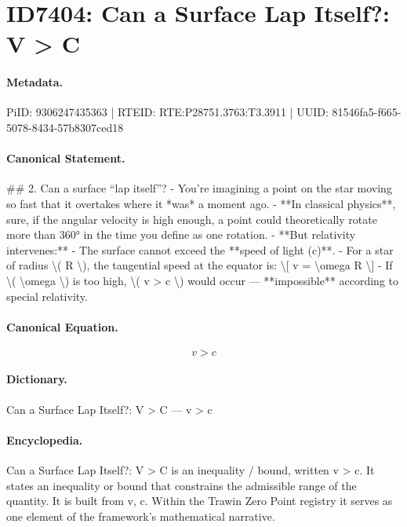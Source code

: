 \section*{ID7404: Can a Surface Lap Itself?: V > C}
\paragraph{Metadata.}
PiID: 9306247435363 | RTEID: RTE:P28751.3763:T3.3911 | UUID: 81546fa5-f665-5078-8434-57b8307ced18

\paragraph{Canonical Statement.}
\#\# 2. Can a surface “lap itself”? - You’re imagining a point on the star moving so fast that it overtakes where it *was* a moment ago. - **In classical physics**, sure, if the angular velocity is high enough, a point could theoretically rotate more than 360° in the time you define as one rotation. - **But relativity intervenes:** - The surface cannot exceed the **speed of light (c)**. - For a star of radius \textbackslash{}( R \textbackslash{}), the tangential speed at the equator is: \textbackslash{}[ v = \textbackslash{}omega R \textbackslash{}] - If \textbackslash{}( \textbackslash{}omega \textbackslash{}) is too high, \textbackslash{}( v > c \textbackslash{}) would occur — **impossible** according to special relativity.

\paragraph{Canonical Equation.}
\[
v > c
\]

\paragraph{Dictionary.}
Can a Surface Lap Itself?: V > C — v > c

\paragraph{Encyclopedia.}
Can a Surface Lap Itself?: V > C is an inequality / bound, written v > c. It states an inequality or bound that constrains the admissible range of the quantity. It is built from v, c. Within the Trawin Zero Point registry it serves as one element of the framework's mathematical narrative.

